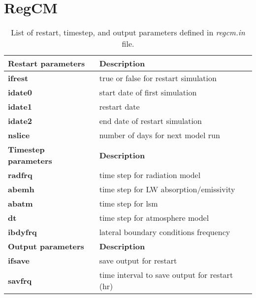 \section{RegCM}
\begin{table}[h]
\begin{center}
\caption{List of restart, timestep, and output parameters defined in {\it regcm.in} file.}  \label{regcm.in_file}
\vspace{0.25cm}
\begin{tabular}{|l|l|} \hline \hline
{\small {\bf Restart parameters}} &   {\small {\bf Description}} \\ \hline \hline
{\footnotesize {\bf ifrest}} & {\footnotesize true or false for restart simulation} \\ \hline
\hspace{.3cm} {\footnotesize {\bf idate0}} & {\footnotesize start date of first simulation} \\ \hline
\hspace{.3cm} {\footnotesize {\bf idate1}} & {\footnotesize restart date} \\ \hline
\hspace{.3cm} {\footnotesize {\bf idate2}} & {\footnotesize end date of restart simulation} \\ \hline
{\footnotesize {\bf nslice}} & {\footnotesize number of days for next model run} \\ \hline \hline
{\small {\bf Timestep parameters}} &   {\small {\bf Description}} \\ \hline \hline
{\footnotesize {\bf radfrq}} & {\footnotesize time step for radiation model} \\ \hline
\hspace{.3cm} {\footnotesize {\bf abemh}}  & {\footnotesize time step for LW absorption/emissivity} \\ \hline
{\footnotesize {\bf abatm}}  & {\footnotesize time step for lsm} \\ \hline
{\footnotesize {\bf dt}}     & {\footnotesize time step for atmosphere model} \\ \hline
{\footnotesize {\bf ibdyfrq}} & {\footnotesize lateral boundary conditions frequency} \\ \hline \hline
{\small {\bf Output parameters}} &   {\small {\bf Description}} \\ \hline \hline
{\footnotesize {\bf ifsave}} & {\footnotesize save output for restart} \\ \hline
\hspace{.3cm} {\footnotesize {\bf savfrq}} & {\footnotesize time interval to save output for restart (hr)} \\ \hline

\end{tabular}
\end{center}
\end{table}
